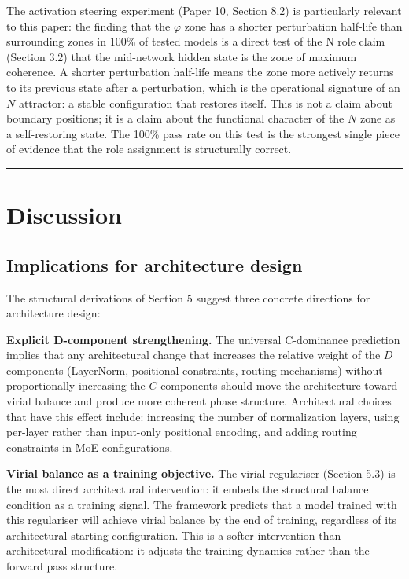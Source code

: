 \documentclass[12pt]{article}
\begin{document}
The activation steering experiment
(\href{https://github.com/baardev/truevalue/blob/main/docnav/Research/papers/10_tholonic-neural-architecture/10_tholonic-neural-architecture.pdf}{Paper
10}, Section 8.2) is particularly relevant to this paper: the finding
that the \(\varphi\) zone has a shorter perturbation half-life than
surrounding zones in 100\% of tested models is a direct test of the N
role claim (Section 3.2) that the mid-network hidden state is the zone
of maximum coherence. A shorter perturbation half-life means the zone
more actively returns to its previous state after a perturbation, which
is the operational signature of an \(N\) attractor: a stable
configuration that restores itself. This is not a claim about boundary
positions; it is a claim about the functional character of the \(N\)
zone as a self-restoring state. The 100\% pass rate on this test is the
strongest single piece of evidence that the role assignment is
structurally correct.

\begin{center}\rule{0.5\linewidth}{0.5pt}\end{center}

\section{Discussion}\label{discussion}

\subsection{Implications for architecture design}\label{implications-for-architecture-design}

The structural derivations of Section 5 suggest three concrete
directions for architecture design:

\textbf{Explicit D-component strengthening.} The universal C-dominance
prediction implies that any architectural change that increases the
relative weight of the \(D\) components (LayerNorm, positional
constraints, routing mechanisms) without proportionally increasing the
\(C\) components should move the architecture toward virial balance and
produce more coherent phase structure. Architectural choices that have
this effect include: increasing the number of normalization layers,
using per-layer rather than input-only positional encoding, and adding
routing constraints in MoE configurations.

\textbf{Virial balance as a training objective.} The virial regulariser
(Section 5.3) is the most direct architectural intervention: it embeds
the structural balance condition as a training signal. The framework
predicts that a model trained with this regulariser will achieve virial
balance by the end of training, regardless of its architectural starting
configuration. This is a softer intervention than architectural
modification: it adjusts the training dynamics rather than the forward
pass structure.
\end{document}
